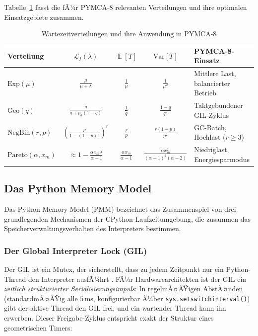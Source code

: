 ﻿\documentclass[a4paper,12pt]{scrreprt}
\theoremstyle{definition}
\DeclareMathOperator{\E}{\mathbb{E}}
\newcommand{\Exp}{\mathrm{Exp}}
\newcommand{\Geo}{\mathrm{Geo}}
\newcommand{\NBin}{\mathrm{NegBin}}
\newcommand{\Pareto}{\mathrm{Pareto}}
\begin{document}
	Tabelle~\ref{tab:distributions} fasst die fÃ¼r PYMCA-8 relevanten
	Verteilungen und ihre optimalen Einsatzgebiete zusammen.
	
	\begin{table}[H]
		\centering
		\caption{Wartezeitverteilungen und ihre Anwendung in PYMCA-8}
		\label{tab:distributions}
		\renewcommand{\arraystretch}{1.4}
		\begin{tabular}{lcccp{4cm}}
			\toprule
			\textbf{Verteilung} & $\mathcal{L}_f(\lambda)$ & $\E[T]$
			& $\mathrm{Var}[T]$ & \textbf{PYMCA-8-Einsatz} \\
			\midrule
			$\Exp(\mu)$
			& $\frac{\mu}{\mu+\lambda}$
			& $\frac{1}{\mu}$
			& $\frac{1}{\mu^2}$
			& Mittlere Last, balancierter Betrieb \\[4pt]
			$\Geo(q)$
			& $\frac{q}{q+p_a(1-q)}$
			& $\frac{1}{q}$
			& $\frac{1-q}{q^2}$
			& Taktgebundener GIL-Zyklus \\[4pt]
			$\NBin(r,p)$
			& $\left(\frac{p}{1-(1-p)z}\right)^r$
			& $\frac{r}{p}$
			& $\frac{r(1-p)}{p^2}$
			& GC-Batch, Hochlast ($r \geq 3$) \\[4pt]
			$\Pareto(\alpha, x_m)$
			& $\approx 1 - \frac{\alpha x_m\lambda}{\alpha-1}$
			& $\frac{\alpha x_m}{\alpha-1}$
			& $\frac{\alpha x_m^2}{(\alpha-1)^2(\alpha-2)}$
			& Niedriglast, Energiesparmodus \\[4pt]
			\bottomrule
		\end{tabular}
	\end{table}
	
	\subsection{Das Python Memory Model}
	
	Das Python Memory Model (PMM) bezeichnet das Zusammenspiel von drei
	grundlegenden Mechanismen der CPython-Laufzeitumgebung, die zusammen
	das Speicherverwaltungsverhalten des Interpreters bestimmen.
	
	\subsubsection{Der Global Interpreter Lock (GIL)}
	
	Der GIL ist ein Mutex, der sicherstellt, dass zu jedem Zeitpunkt nur ein
	Python-Thread den Interpreter ausfÃ¼hrt \cite{python_gil}. FÃ¼r Hardwarearchitekten
	ist der GIL ein \emph{zeitlich strukturierter Serialisierungsimpuls}: In
	regelmÃ¤ÃŸigen AbstÃ¤nden (standardmÃ¤ÃŸig alle $5\,\mathrm{ms}$, konfigurierbar
	Ã¼ber \texttt{sys.setswitchinterval()}) gibt der aktive Thread den GIL frei,
	und ein wartender Thread kann ihn erwerben. Dieser Freigabe-Zyklus entspricht
	exakt der Struktur eines geometrischen Timers:
	
\end{document}
